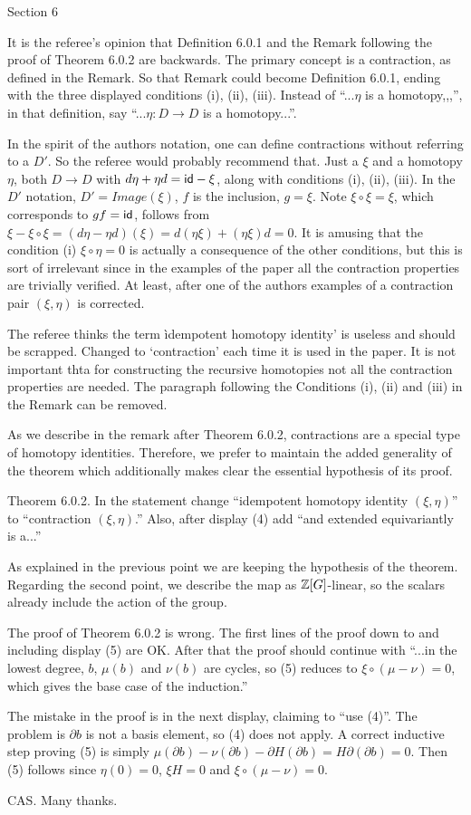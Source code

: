 Section 6

\subitem It is the referee's opinion that Definition 6.0.1 and the Remark following the proof of Theorem 6.0.2 are backwards. The primary concept is a contraction, as defined in the Remark. So that Remark could become Definition 6.0.1, ending with the three displayed conditions (i), (ii), (iii). Instead of ``...$\eta$ is a homotopy,,,'', in that definition, say ``...$\eta\colon D\to D$ is a homotopy...''.

In the spirit of the authors notation, one can define contractions without referring to a $D'$. So the referee would probably recommend that. Just a $\xi$ and a homotopy $\eta$, both $D\to D$ with $d\eta+\eta d = \mathsf{id}-\xi$, along with conditions (i), (ii), (iii). In the $D'$ notation, $D' = Image(\xi)$, $f$ is the inclusion, $g = \xi$. Note $\xi\circ\xi = \xi$, which corresponds to $gf=\mathsf{id}$, follows from $\xi-\xi\circ\xi = (d\eta-\eta d)(\xi) = d(\eta\xi) + (\eta\xi)d = 0$. It is amusing that the condition (i) $\xi\circ\eta=0$ is actually a consequence of the other conditions, but this is sort of irrelevant since in the examples of the paper all the contraction properties are trivially verified. At least, after one of the authors examples of a contraction pair $(\xi,\eta)$ is corrected.

The referee thinks the term ìdempotent homotopy identity' is useless and should be scrapped.
Changed to `contraction' each time it is used in the paper. It is not important thta for constructing the recursive homotopies not all the contraction properties are needed. The paragraph following the Conditions (i), (ii) and (iii) in the Remark can be removed.

\ar As we describe in the remark after Theorem 6.0.2, contractions are a special type of homotopy identities.
Therefore, we prefer to maintain the added generality of the theorem which additionally makes clear the essential hypothesis of its proof.

\subitem Theorem 6.0.2. In the statement change ``idempotent homotopy identity $(\xi,\eta)$'' to ``contraction $(\xi,\eta)$.'' Also, after display (4) add ``and extended equivariantly is a...''

\ar As explained in the previous point we are keeping the hypothesis of the theorem.
Regarding the second point, we describe the map as $\mathbb{Z}[G]$-linear, so the scalars already include the action of the group.

\subitem The proof of Theorem 6.0.2 is wrong. The first lines of the proof down to and including display (5) are OK. After that the proof should continue with ``...in the lowest degree, $b$, $\mu(b)$ and $\nu(b)$ are cycles, so (5) reduces to $\xi\circ (\mu-\nu) = 0$, which gives the base case of the induction.''

The mistake in the proof is in the next display, claiming to ``use (4)''.
The problem is $\partial b$ is not a basis element, so (4) does not apply.
A correct inductive step proving (5) is simply
$\mu(\partial b) - \nu(\partial b) - \partial H(\partial b) = H\partial(\partial b) = 0.$ Then (5) follows since $\eta(0) = 0$, $\xi H=0$ and $\xi\circ (\mu-\nu) = 0$.

\ar CAS. Many thanks.